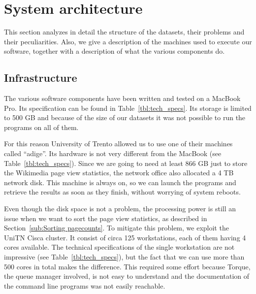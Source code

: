 \cleardoublepage{}
\chapter{System architecture}
\label{cha:system_architecture}
This section analyzes in detail the structure of the datasets, their problems and their peculiarities.
Also, we give a description of the machines used to execute our software, together with a description of what the various components do.

\section{Infrastructure}
\label{sec:infrastructure}
The various software components have been written and tested on a MacBook Pro.
Its specification can be found in Table~\ref{tbl:tech_specs}.
Its storage is limited to 500 GB and because of the size of our datasets it was not possible to run the programs on all of them.

For this reason University of Trento allowed us to use one of their machines called ``adige''.
Its hardware is not very different from the MacBook (see Table~\ref{tbl:tech_specs}).
Since we are going to need at least 866 GB just to store the Wikimedia page view statistics, the network office also allocated a 4 TB network disk.
This machine is always on, so we can launch the programs and retrieve the results as soon as they finish, without worrying of system reboots.

Even though the disk space is not a problem, the processing power is still an issue when we want to sort the page view statistics, as described in Section~\ref{sub:Sorting pagecounts}.
To mitigate this problem, we exploit the UniTN Cisca cluster.
It consist of circa 125 workstations, each of them having 4 cores available.
The technical specifications of the single workstation are not impressive (see Table~\ref{tbl:tech_specs}), but the fact that we can use more than 500 cores in total makes the difference.
This required some effort because Torque, the queue manager involved, is not easy to understand and the documentation of the command line programs was not easily reachable.

